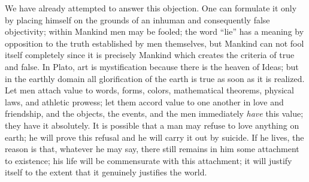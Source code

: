\documentclass[11pt]{article}
\begin{document}
{{We have already attempted to answer this objection. One can formulate it only by placing himself on the grounds of an inhuman and consequently false objectivity; within Mankind men may be fooled; the word “lie” has a meaning by opposition to the truth established by men themselves, but Mankind can not fool itself completely since it is precisely Mankind which creates the criteria of true and false. In Plato, art is mystification because there is the heaven of Ideas; but in the earthly domain all glorification of the earth is true as soon as it is realized. Let men attach value to words, forms, colors, mathematical theorems, physical laws, and athletic prowess; let them accord value to one another in love and friendship, and the objects, the events, and the men immediately \textit{have} this value; they have it absolutely. It is possible that a man may refuse to love anything on earth; he will prove this refusal and he will carry it out by suicide. If he lives, the reason is that, whatever he may say, there still remains in him some attachment to existence; his life will be commensurate with this attachment; it will justify itself to the extent that it genuinely justifies the world.

}}
\end{document}
